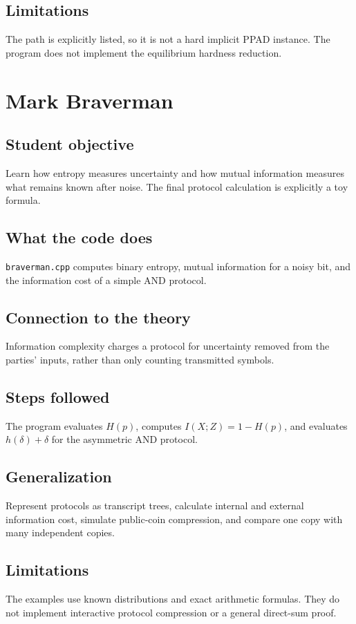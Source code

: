 \documentclass[11pt]{book}
\begin{document}
\section{Limitations}
The path is explicitly listed, so it is not a hard implicit PPAD instance. The program does not implement the equilibrium hardness reduction.

\chapter{Mark Braverman}
\section{Student objective}
Learn how entropy measures uncertainty and how mutual information measures what remains known after noise. The final protocol calculation is explicitly a toy formula.
\section{What the code does}
\texttt{braverman.cpp} computes binary entropy, mutual information for a noisy bit, and the information cost of a simple AND protocol.

\section{Connection to the theory}
Information complexity charges a protocol for uncertainty removed from the parties' inputs, rather than only counting transmitted symbols.

\section{Steps followed}
The program evaluates $H(p)$, computes $I(X;Z)=1-H(p)$, and evaluates $h(\delta)+\delta$ for the asymmetric AND protocol.

\section{Generalization}
Represent protocols as transcript trees, calculate internal and external information cost, simulate public-coin compression, and compare one copy with many independent copies.

\section{Limitations}
The examples use known distributions and exact arithmetic formulas. They do not implement interactive protocol compression or a general direct-sum proof.
\end{document}
